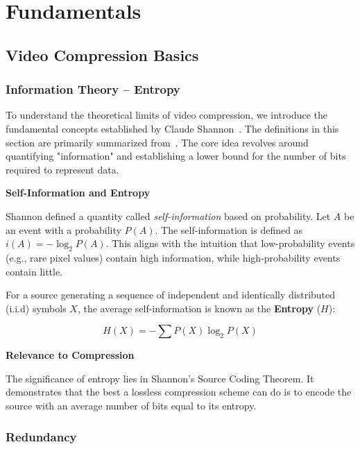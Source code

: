 
\chapter{Fundamentals}

\section{Video Compression Basics}

\subsection{Information Theory -- Entropy}

To understand the theoretical limits of video compression, we introduce the fundamental concepts established by Claude Shannon~\cite{shannon}. The definitions in this section are primarily summarized from~\cite{compression_book}. The core idea revolves around quantifying "information" and establishing a lower bound for the number of bits required to represent data.

\noindent \textbf{Self-Information and Entropy}

Shannon defined a quantity called \textit{self-information} based on probability. Let $A$ be an event with a probability $P(A)$. The self-information is defined as $i(A) = -\log_2 P(A)$. This aligns with the intuition that low-probability events (e.g., rare pixel values) contain high information, while high-probability events contain little.

For a source generating a sequence of independent and identically distributed (i.i.d) symbols $X$, the average self-information is known as the \textbf{Entropy} ($H$):

\begin{equation}
    H(X) = - \sum P(X) \log_2 P(X)
\end{equation}

\noindent \textbf{Relevance to Compression}

The significance of entropy lies in Shannon's Source Coding Theorem. It demonstrates that the best a lossless compression scheme can do is to encode the source with an average number of bits equal to its entropy.

\subsection{Redundancy}

